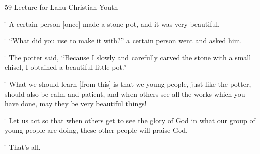 
59 Lecture for Lahu Christian Youth

\. A certain person [once] made a stone pot, and it was very beautiful.

\. ``What did you use to make it with?'' a certain person went and asked him.

\. The potter said, ``Because I slowly and carefully carved the stone with a small
chisel, I obtained a beautiful little pot.''

\. What we should learn [from this] is that we young people, just like the potter,
should also be calm and patient, and when others see all the works which you have
done, may they be very beautiful things!

\. Let us act so that when others get to see the glory of God in what our group
of young people are doing, these other people will praise God.

\. That's all.


